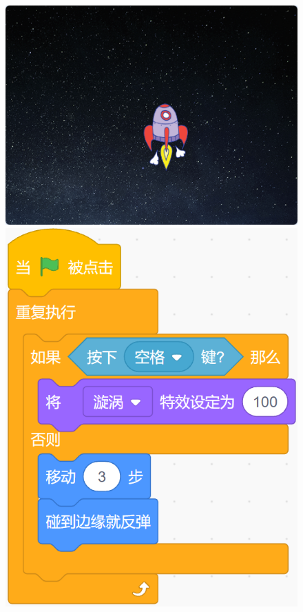 \documentclass[10pt, a4paper]{article}
\begin{document}
\begin{enumerate}
        \begin{figure}[htbp]
            \centering
            \begin{minipage}[t]{.4\textwidth}
                \centering
                \begin{minipage}[t]{.48\textwidth}
                    \centering
                    \includegraphics[width=\textwidth]{6-1.png}
                \end{minipage}
                \begin{minipage}[t]{.42\textwidth}
                    \centering
                    \includegraphics[width=\textwidth]{6-2.png}

\end{minipage}
\end{minipage}
\end{figure}
\end{enumerate}
\end{document}
